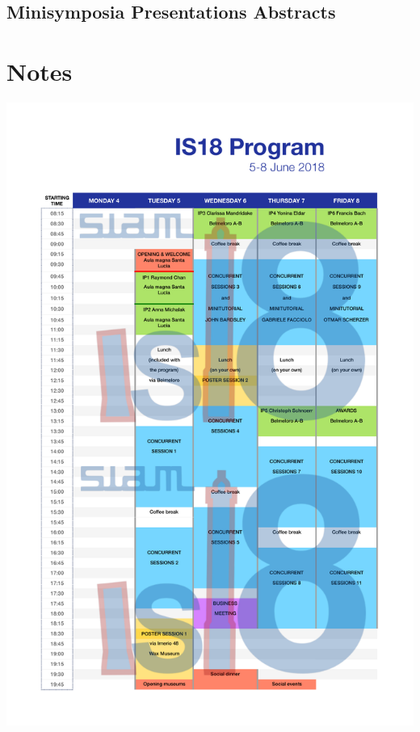 \documentclass[twoside]{book}
\begin{document}
\chapter*{Minisymposia Presentations Abstracts}


%

%

\newpage
\part{Notes}
\thispagestyle{empty}
\includegraphics[scale=0.6]{program_table.pdf}
\end{document}
